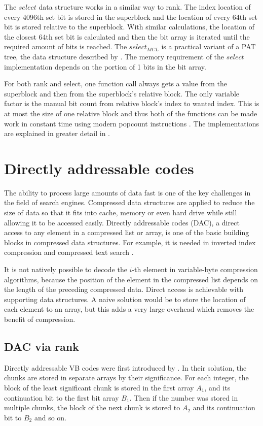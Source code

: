 The $select$ data structure works in a similar way to rank. The index location of every 4096th set bit is stored in the superblock and the location of every 64th set bit is stored 
relative to the superblock. With similar calculations, the location of the closest 64th set bit is calculated and then the bit array is iterated until the required amount of bits is reached. The $select_{MCL}$
 is a practical variant of a PAT tree, the data structure described by \cite{Cla97}. The memory requirement of the $select$ implementation depends on the portion of 1 bits in the bit array.

For both rank and select, one function call always gets a value from the superblock and then from the superblock's relative block. The only variable factor is the manual bit count from relative
block's index to wanted index. This is at most the size of one relative block and thus both of the functions can be made work in constant time using modern popcount instructions \citep{Gon05}. The 
implementations are explained in greater detail in \cite{gbmp2014sea}.




\chapter{Directly addressable codes} \label{chapter:DAC}

The ability to process large amounts of data fast is one of the key challenges in the field of search engines. Compressed data structures are applied to reduce the size of data so that it fits 
into cache, memory or even hard drive while still allowing it to be accessed easily. Directly addressable codes (DAC), a direct access to any element in a compressed list or array, is 
one of the basic building blocks in compressed data structures. For example, it is needed in inverted index compression \citep{Cul07} and compressed text search \citep{Mou00}.

It is not natively possible to decode the $i$-th element in variable-byte compression algorithms, because the position of the element in the compressed
list depends on the length of the preceding compressed data. Direct access is achievable with supporting data structures. A naive solution would be to store the location 
of each element to an array, but this adds a very large overhead which removes the benefit of compression. 



\section{DAC via rank}
\label{chap:implementations}
Directly addressable VB codes were first introduced by \citep{Bri09}. In their solution, the chunks are stored in separate arrays by their significance. For each integer, the block 
of the least significant chunk is stored in the first array $A_1$, and its continuation bit to the first bit array $B_1$. Then if the number was stored in multiple chunks, the block of the next chunk is
stored to $A_2$ and its continuation bit to $B_2$ and so on.

